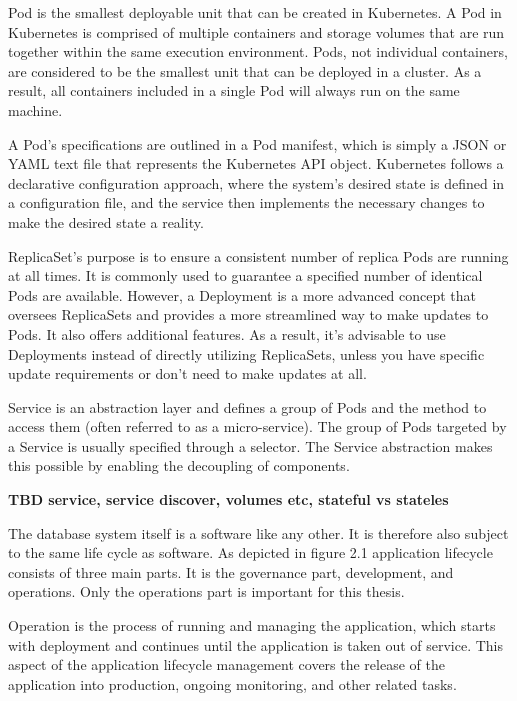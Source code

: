 Pod is the smallest deployable unit that can be created in Kubernetes. \cite{docuKubePods} A Pod in Kubernetes is comprised of multiple containers and storage volumes that are run together within the same execution environment. Pods, not individual containers, are considered to be the smallest unit that can be deployed in a cluster. As a result, all containers included in a single Pod will always run on the same machine. \cite{kubeUpAndRunningPods}

A Pod's specifications are outlined in a Pod manifest, which is simply a JSON or YAML text file that represents the Kubernetes API object. Kubernetes follows a declarative configuration approach, where the system's desired state is defined in a configuration file, and the service then implements the necessary changes to make the desired state a reality. \cite{docuKubeStaticPod}

ReplicaSet’s purpose is to ensure a consistent number of replica Pods are running at all times. It is commonly used to guarantee a specified number of identical Pods are available. However, a Deployment is a more advanced concept that oversees ReplicaSets and provides a more streamlined way to make updates to Pods. It also offers additional features. As a result, it's advisable to use Deployments instead of directly utilizing ReplicaSets, unless you have specific update requirements or don't need to make updates at all. \cite{docuKubeReplicaset}

Service is an abstraction layer and defines a group of Pods and the method to access them (often referred to as a micro-service). The group of Pods targeted by a Service is usually specified through a selector. The Service abstraction makes this possible by enabling the decoupling of components. \cite{docuKubeSevice}

\textbf{TBD service, service discover, volumes etc, stateful vs stateles}





The database system itself is a software like any other. It is therefore also subject to the same life cycle as software.
As depicted in figure 2.1 application lifecycle consists of three main parts. It is the governance part, development, and operations. Only the operations part is important for this thesis.

Operation is the process of running and managing the application, which starts with deployment and continues until the application is taken out of service. This aspect of the application lifecycle management covers the release of the application into production, ongoing monitoring, and other related tasks. \cite{ALM}


